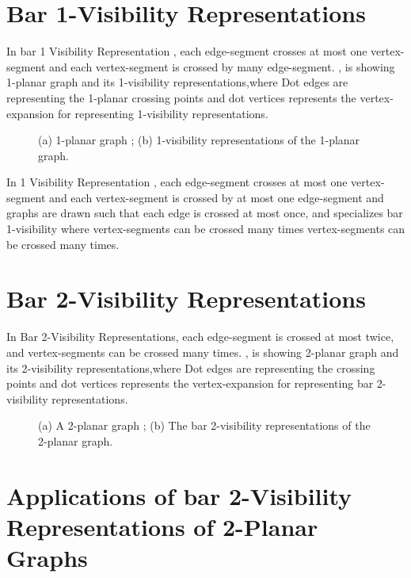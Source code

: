 \section{Bar 1-Visibility Representations}
\label{sec:b1}


In bar 1 Visibility Representation , each edge-segment crosses at most one vertex-segment and each vertex-segment is crossed by many edge-segment.
 , is showing 1-planar graph and its 1-visibility representations,where Dot edges are representing the 1-planar crossing points and dot vertices represents the vertex-expansion for representing 1-visibility representations. 


\begin{figure}[!tb]
  \centering
\resizebox{150mm}{!}{}
\caption{(a) 1-planar graph ; (b) 1-visibility representations of the 1-planar graph.}
\label{fig:1v}
\end{figure}

In 1 Visibility Representation \cite{FJ}, each edge-segment crosses at most one vertex-segment and each vertex-segment is crossed by at most one edge-segment and graphs are drawn such that each edge is crossed at most once, and specializes bar 1-visibility where vertex-segments can be crossed many times vertex-segments can be crossed many times.



\section{Bar 2-Visibility Representations}
\label{sec:b2}
In Bar 2-Visibility Representations, each edge-segment is crossed at most twice, and  vertex-segments can be crossed many times. , is showing 2-planar graph and its 2-visibility representations,where Dot edges are representing the crossing points and dot vertices represents the vertex-expansion for representing bar 2-visibility representations.


\begin{figure}[!tb]
\centering
\resizebox{150mm}{!}{}
\caption{(a) A 2-planar graph ; (b) The bar 2-visibility representations of the 2-planar graph.}
\label{fig:2v}
\end{figure}





\section{Applications of bar 2-Visibility Representations of 2-Planar Graphs}
\label{sec:application}

